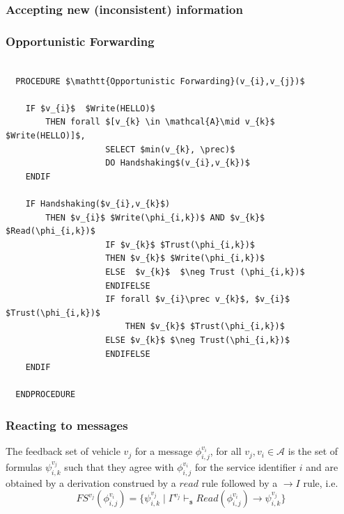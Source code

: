 \documentclass{beamer}
\begin{document}
\begin{frame}
	\label{conclusion0}
	\frametitle{Accepting new (inconsistent) information}
	\smallskip


  \begin{prooftree}
	\end{prooftree}

\end{frame}


\begin{frame}[fragile]
	\label{conclusion1}
	\frametitle{Opportunistic Forwarding}
	\smallskip

  \lstset{language=Java,
    basicstyle=\scriptsize,
    mathescape}
  	\begin{lstlisting}[frame=single]  % Start your code-block

  PROCEDURE $\mathtt{Opportunistic Forwarding}(v_{i},v_{j})$

  	IF $v_{i}$  $Write(HELLO)$
  	    THEN forall $[v_{k} \in \mathcal{A}\mid v_{k}$ $Write(HELLO)]$,
  					SELECT $min(v_{k}, \prec)$
  					DO Handshaking$(v_{i},v_{k})$
  	ENDIF

  	IF Handshaking($v_{i},v_{k}$)
  		THEN $v_{i}$ $Write(\phi_{i,k})$ AND $v_{k}$ $Read(\phi_{i,k})$
  					IF $v_{k}$ $Trust(\phi_{i,k})$
  					THEN $v_{k}$ $Write(\phi_{i,k})$
  					ELSE  $v_{k}$  $\neg Trust (\phi_{i,k})$
  					ENDIFELSE
  					IF forall $v_{i}\prec v_{k}$, $v_{i}$ $Trust(\phi_{i,k})$
  						THEN $v_{k}$ $Trust(\phi_{i,k})$
  					ELSE $v_{k}$ $\neg Trust(\phi_{i,k})$
  					ENDIFELSE
  	ENDIF

  ENDPROCEDURE
  	\end{lstlisting}
\end{frame}



\begin{frame}
\label{feedback}
\frametitle{Reacting to messages}
\smallskip

\begin{definition}
The feedback set of vehicle $v_{j}$ for a message $\phi^{v_{i}}_{i,j}$, for all $v_{j}, v_{i} \in \mathcal{A}$ is the set of formulas $\psi^{v_{j}}_{i,k}$ such that they agree with $\phi^{v_{i}}_{i,j}$ for the service identifier $i$ and are obtained by a derivation construed by a $read$ rule followed by a $\rightarrow I$ rule, i.e.
%
\[
FS^{v_{j}}(\phi^{v_{i}}_{i,j})=\{ \psi^{v_{j}}_{i,k}\mid \Gamma^{v_{j}}
\vdash_{\mathtt{s}}  Read(\phi^{v_{i}}_{i,j})\rightarrow \psi^{v_{j}}_{i,k}  \}
\]
\end{definition}

\end{frame}
\end{document}
